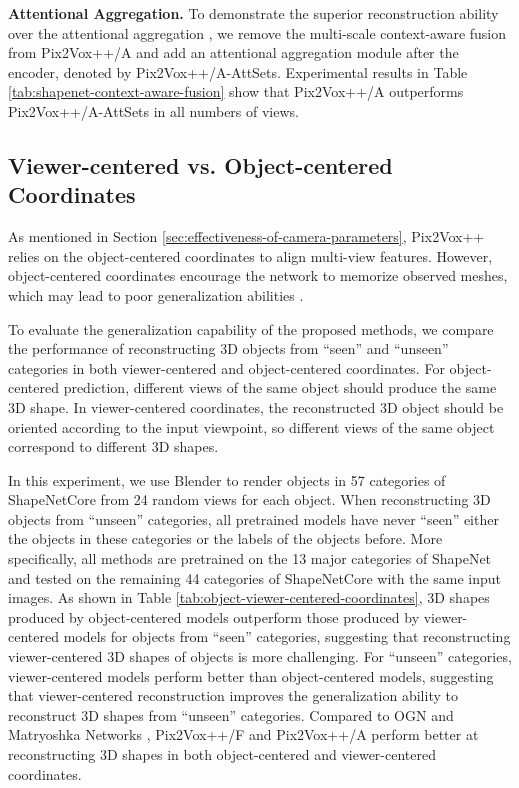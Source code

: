 \documentclass[twocolumn]{svjour3}
\begin{document}
\noindent \textbf{Attentional Aggregation.}
To demonstrate the superior reconstruction ability over the attentional aggregation \citep{DBLP:journals/ijcv/YangSAN19}, we remove the multi-scale context-aware fusion from Pix2Vox++/A and add an attentional aggregation module after the encoder, denoted by Pix2Vox++/A-AttSets.
Experimental results in Table \ref{tab:shapenet-context-aware-fusion} show that Pix2Vox++/A outperforms Pix2Vox++/A-AttSets in all numbers of views.

\subsection{Viewer-centered vs. Object-centered Coordinates}

As mentioned in Section \ref{sec:effectiveness-of-camera-parameters}, Pix2Vox++ relies on the object-centered coordinates to align multi-view features.
However, object-centered coordinates encourage the network to memorize observed meshes, which may lead to poor generalization abilities \citep{DBLP:conf/cvpr/ShinFH18}.

To evaluate the generalization capability of the proposed methods, we compare the performance of reconstructing 3D objects from ``seen'' and ``unseen'' categories in both viewer-centered and object-centered coordinates.
For object-centered prediction, different views of the same object should produce the same 3D shape.
In viewer-centered coordinates, the reconstructed 3D object should be oriented  according to the input viewpoint, so different views of the same object correspond to different 3D shapes.

In this experiment, we use Blender to render objects in 57 categories of ShapeNetCore \citep{DBLP:journals/corr/ChangFGHHLSSSSX15} from 24 random views for each object. 
When reconstructing 3D objects from ``unseen'' categories, all pretrained models have never ``seen'' either the objects in these categories or the labels of the objects before.
More specifically, all methods are pretrained on the 13 major categories of ShapeNet and tested on the remaining 44 categories of ShapeNetCore with the same input images.
As shown in Table \ref{tab:object-viewer-centered-coordinates}, 3D shapes produced by object-centered models outperform those produced by viewer-centered models for objects from ``seen'' categories, suggesting that reconstructing viewer-centered 3D shapes of objects is more challenging.
For ``unseen'' categories, viewer-centered models perform better than object-centered models, suggesting that viewer-centered reconstruction improves the generalization ability to reconstruct 3D shapes from ``unseen'' categories.
Compared to OGN \citep{DBLP:conf/iccv/TatarchenkoDB17} and Matryoshka Networks \citep{DBLP:conf/cvpr/Richter018}, Pix2Vox++/F and Pix2Vox++/A perform better at reconstructing 3D shapes in both object-centered and viewer-centered coordinates.
\end{document}
